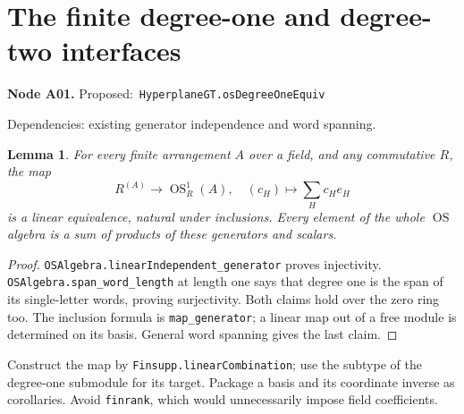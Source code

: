 \documentclass[11pt]{article}
\newtheorem{lemma}[theorem]{Lemma}
\theoremstyle{remark}\newtheorem{remark}[theorem]{Remark}
\newcommand{\OS}{\ensuremath{\operatorname{OS}}}
\newcommand{\code}[1]{\nolinkurl{#1}}
\newcommand{\node}[3]{\par\Needspace{8\baselineskip}\smallskip\noindent\textbf{Node #1.}\quad
 \textsf{Proposed:}\ \code{#2}\par\noindent
 \textsf{Dependencies:} #3.\par\smallskip}
\begin{document}
\section{The finite degree-one and degree-two interfaces}
\label{sec:finite}

\node{A01}{HyperplaneGT.osDegreeOneEquiv}{existing generator independence and word spanning}
\begin{lemma}\label{lem:a01}
For every finite arrangement $A$ over a field, and any commutative
$R$, the map
\[
 R^{(A)}\longrightarrow\OS_R^1(A),\quad
 (c_H)\longmapsto\sum_Hc_He_H
\]
is a linear equivalence, natural under inclusions. Every element of
the whole \OS{} algebra is a sum of products of these generators
and scalars.
\end{lemma}
\begin{proof}
\code{OSAlgebra.linearIndependent_generator} proves injectivity.
\code{OSAlgebra.span_word_length} at length one says that degree
one is the span of its single-letter words, proving surjectivity.
Both claims hold over the zero ring too. The inclusion formula is
\code{map_generator}; a linear map out of a free module is
determined on its basis. General word spanning gives the last claim.
\end{proof}
Construct the map by \code{Finsupp.linearCombination}; use the
subtype of the degree-one submodule for its target. Package a basis
and its coordinate inverse as corollaries. Avoid \code{finrank},
which would unnecessarily impose field coefficients.
\end{document}
